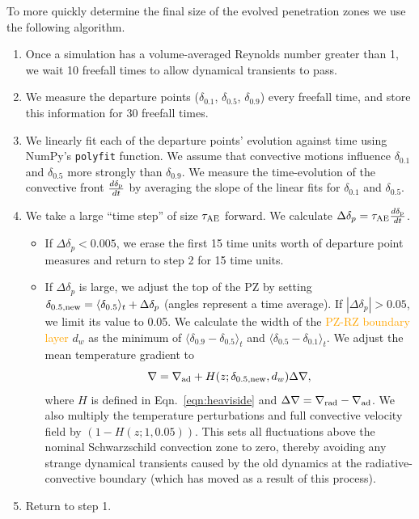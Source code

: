 \documentclass[twocolumn, linenumbers]{aastex631}
\newcommand{\gradrad}{\ensuremath{\nabla_{\rm{rad}}}}
\newcommand{\gradad}{\ensuremath{\nabla_{\rm{ad}}}}
\newcommand{\justgrad}{\ensuremath{\nabla}}
\newcommand{\delp}{\ensuremath{\delta_{\rm{p}}}}
\newcommand{\angles}[1]{\langle #1 \rangle}
\newcommand{\editone}[1]{\textcolor{orange}{#1}}
\begin{document}
To more quickly determine the final size of the evolved penetration zones we use the following algorithm.
\begin{enumerate}
\item Once a simulation has a volume-averaged Reynolds number greater than 1, we wait 10 freefall times to allow dynamical transients to pass.
\item We measure the departure points ($\delta_{0.1}$, $\delta_{0.5}$, $\delta_{0.9}$) every freefall time, and store this information for 30 freefall times.
\item We linearly fit each of the departure points' evolution against time using NumPy's \texttt{polyfit} function.
We assume that convective motions influence $\delta_{0.1}$ and $\delta_{0.5}$ more strongly than $\delta_{0.9}$.
We measure the time-evolution of the convective front $\frac{d \delp}{dt}$ by averaging the slope of the linear fits for $\delta_{0.1}$ and $\delta_{0.5}$.
\item We take a large ``time step'' of size $\tau_{\rm{AE}}$ forward.
We calculate $\Delta \delta_p = \tau_{\rm{AE}} \frac{d \delp}{dt}$.
\begin{itemize}
\item If $\Delta \delta_p < 0.005$, we erase the first 15 time units worth of departure point measures and return to step 2 for 15 time units.
\item  If $\Delta \delta_p$ is large, we adjust the top of the PZ by setting $\delta_{0.5,\rm{new}} = \angles{\delta_{0.5}}_t + \Delta \delta_p$ (angles represent a time average).
If $|\Delta \delta_p| > 0.05$, we limit its value to 0.05.
We calculate the width of the \editone{PZ-RZ boundary layer} $d_w$ as the minimum of $\angles{\delta_{0.9} - \delta_{0.5}}_t$ and $\angles{\delta_{0.5} - \delta_{0.1}}_t$.
We adjust the mean temperature gradient to
\begin{equation}
\justgrad = \gradad + H(z; \delta_{\rm{0.5,\rm{new}}}, d_w) \Delta\justgrad,
\label{eqn:initial_grad}
\end{equation}
where $H$ is defined in Eqn.~\ref{eqn:heaviside} and $\Delta\justgrad = \gradrad - \gradad$.
We also multiply the temperature perturbations and full convective velocity field by $(1 - H(z; 1, 0.05))$.
This sets all fluctuations above the nominal Schwarzschild convection zone to zero, thereby avoiding any strange dynamical transients caused by the old dynamics at the radiative-convective boundary (which has moved as a result of this process).
\end{itemize}
\item Return to step 1.
\end{enumerate}
\end{document}
